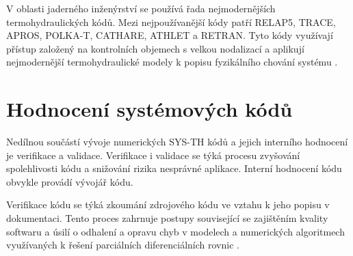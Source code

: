 V oblasti jaderného inženýrství se používá řada nejmodernějších termohydraulických kódů. Mezi nejpoužívanější kódy patří RELAP5, TRACE, APROS, POLKA-T, CATHARE, ATHLET a RETRAN. Tyto kódy využívají přístup založený na kontrolních objemech s velkou nodalizací a aplikují nejmodernější termohydraulické modely k popisu fyzikálního chování systému \cite{petruzzi2008thermal}.
\section{Hodnocení systémových kódů}
Nedílnou součástí vývoje numerických SYS-TH kódů a jejich interního hodnocení je verifikace a validace. Verifikace i validace se týká procesu zvyšování spolehlivosti kódu a snižování rizika nesprávné aplikace. Interní hodnocení kódu obvykle provádí vývojář kódu.


Verifikace kódu se týká zkoumání zdrojového kódu ve vztahu k jeho popisu v dokumentaci. Tento proces zahrnuje postupy související se zajištěním kvality softwaru a úsilí o odhalení a opravu chyb v modelech a numerických algoritmech využívaných k řešení parciálních diferenciálních rovnic \cite{petruzzi2008thermal}.

